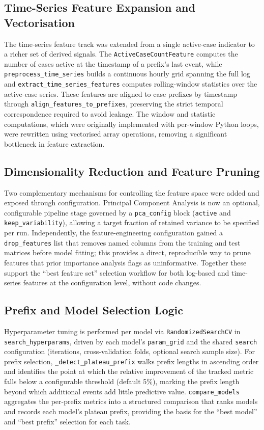 \documentclass[runningheads]{llncs}
\begin{document}
\subsection{Time-Series Feature Expansion and Vectorisation}
The time-series feature track was extended from a single active-case indicator to a richer set
of derived signals. The \texttt{ActiveCaseCountFeature} computes the number of cases active at
the timestamp of a prefix's last event, while \texttt{preprocess\_time\_series} builds a
continuous hourly grid spanning the full log and \texttt{extract\_time\_series\_features}
computes rolling-window statistics over the active-case series. These features are aligned to
case prefixes by timestamp through \texttt{align\_features\_to\_prefixes}, preserving the strict
temporal correspondence required to avoid leakage. The window and statistic computations, which
were originally implemented with per-window Python loops, were rewritten using vectorised array
operations, removing a significant bottleneck in feature extraction.

\subsection{Dimensionality Reduction and Feature Pruning}
Two complementary mechanisms for controlling the feature space were added and exposed through
configuration. Principal Component Analysis is now an optional, configurable pipeline stage
governed by a \texttt{pca\_config} block (\texttt{active} and \texttt{keep\_variability}),
allowing a target fraction of retained variance to be specified per run. Independently, the
feature-engineering configuration gained a \texttt{drop\_features} list that removes named
columns from the training and test matrices before model fitting; this provides a direct,
reproducible way to prune features that prior importance analysis flags as uninformative.
Together these support the ``best feature set'' selection workflow for both log-based and
time-series features at the configuration level, without code changes.

\subsection{Prefix and Model Selection Logic}
Hyperparameter tuning is performed per model via \texttt{RandomizedSearchCV} in
\texttt{search\_hyperparams}, driven by each model's \texttt{param\_grid} and the shared
\texttt{search} configuration (iterations, cross-validation folds, optional search sample size).
For prefix selection, \texttt{\_detect\_plateau\_prefix} walks prefix lengths in ascending order
and identifies the point at which the relative improvement of the tracked metric falls below a
configurable threshold (default 5\%), marking the prefix length beyond which additional events
add little predictive value. \texttt{compare\_models} aggregates the per-prefix metrics into a
structured comparison that ranks models and records each model's plateau prefix, providing the
basis for the ``best model'' and ``best prefix'' selection for each task.
\end{document}
